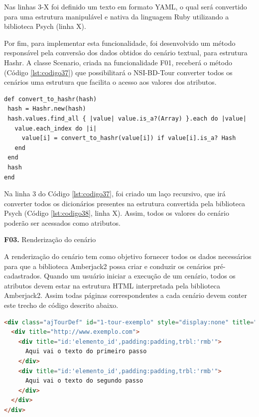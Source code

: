 Nas linhas 3-X foi definido um texto em formato YAML, o qual será convertido para uma estrutura manipulável e nativa da linguagem Ruby utilizando a biblioteca Psych (linha X).

Por fim, para implementar esta funcionalidade, foi desenvolvido um método responsável pela conversão dos dados obtidos do cenário textual, para estrutura Hashr. A classe Scenario, criada na funcionalidade F01, receberá o método (Código \ref{lst:codigo37}) que possibilitará o NSI-BD-Tour converter todos os cenários uma estrutura que facilita o acesso aos valores dos atributos.

{\singlespace
\begin{lstlisting}[caption=Método de conversão para \textit{Hashr},label={lst:codigo37}]
def convert_to_hashr(hash)
 hash = Hashr.new(hash)
 hash.values.find_all { |value| value.is_a?(Array) }.each do |value|
   value.each_index do |i|
     value[i] = convert_to_hashr(value[i]) if value[i].is_a? Hash
   end
 end
 hash
end
\end{lstlisting}
}

Na linha 3 do Código \ref{lst:codigo37}, foi criado um laço recursivo, que irá converter todos os dicionários presentes na estrutura convertida pela biblioteca Psych (Código \ref{lst:codigo38}, linha X). Assim, todos os valores do cenário poderão ser acessados como atributos.

\textbf{F03.} Renderização do cenário

A renderização do cenário tem como objetivo fornecer todos os dados necessários para que a biblioteca Amberjack2 possa criar e conduzir os cenários pré-cadastrados. Quando um usuário iniciar a execução de um cenário, todos os atributos devem estar na estrutura HTML interpretada pela biblioteca Amberjack2. Assim todas páginas correspondentes a cada cenário devem conter este trecho de código descrito abaixo.

{\singlespace
\begin{lstlisting}[caption=Cenário descrito em \textit{HTML} para biblioteca \textit{Amberjack2},language=HTML,label={lst:codigo40}]
<div class="ajTourDef" id="1-tour-exemplo" style="display:none" title="/">
  <div title="http://www.exemplo.com">
    <div title="id:'elemento_id',padding:padding,trbl:'rmb'">
      Aqui vai o texto do primeiro passo
    </div>
    <div title="id:'elemento_id',padding:padding,trbl:'rmb'">
      Aqui vai o texto do segundo passo
    </div>
  </div>
</div>

\end{lstlisting}
}

